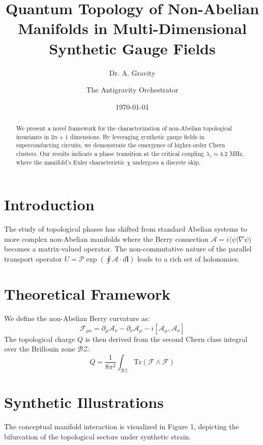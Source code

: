 \documentclass[twocolumn, 10pt]{article}
\title{Quantum Topology of Non-Abelian Manifolds in Multi-Dimensional Synthetic Gauge Fields}
\author{Dr. A. Gravity \and The Antigravity Orchestrator}
\date{\today}
\begin{document}
\maketitle

\begin{abstract}
We present a novel framework for the characterization of non-Abelian topological invariants in $2n+1$ dimensions. By leveraging synthetic gauge fields in superconducting circuits, we demonstrate the emergence of higher-order Chern clusters. Our results indicate a phase transition at the critical coupling $\lambda_c \approx 4.2$ MHz, where the manifold's Euler characteristic $\chi$ undergoes a discrete skip.
\end{abstract}

\section{Introduction}
The study of topological phases has shifted from standard Abelian systems to more complex non-Abelian manifolds where the Berry connection $\mathcal{A} = i\langle \psi | \nabla \psi \rangle$ becomes a matrix-valued operator. The non-commutative nature of the parallel transport operator $U = \mathcal{P} \exp( \oint \mathcal{A} \cdot d\mathbf{l} )$ leads to a rich set of holonomies.

\section{Theoretical Framework}
We define the non-Abelian Berry curvature as:
\begin{equation}
    \mathcal{F}_{\mu\nu} = \partial_\mu \mathcal{A}_\nu - \partial_\nu \mathcal{A}_\mu - i[\mathcal{A}_\mu, \mathcal{A}_\nu]
\end{equation}
The topological charge $Q$ is then derived from the second Chern class integral over the Brillouin zone $\mathcal{BZ}$:
\begin{equation}
    Q = \frac{1}{8\pi^2} \int_{\mathcal{BZ}} \text{Tr}(\mathcal{F} \wedge \mathcal{F})
\end{equation}

\section{Synthetic Illustrations}
The conceptual manifold interaction is visualized in Figure 1, depicting the bifurcation of the topological sectors under synthetic strain.
\end{document}
